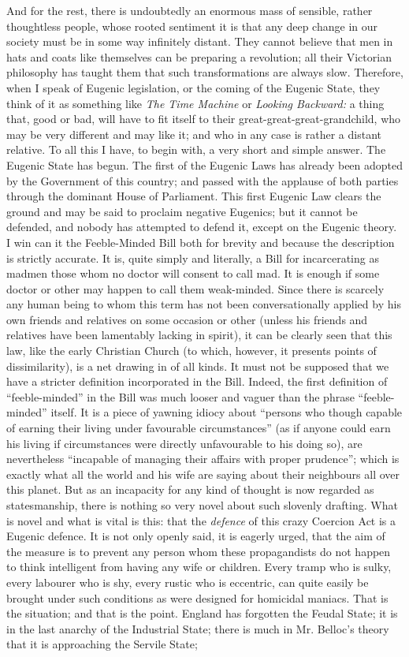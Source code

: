 \documentclass{book}
\begin{document}
And for the rest, there is undoubtedly an enormous mass of sensible, rather thoughtless people, whose rooted sentiment it is that any deep change in our society must be in some way infinitely distant. They cannot believe that men in hats and coats like themselves can be preparing a revolution; all their Victorian philosophy has taught them that such transformations are always slow. Therefore, when I speak of Eugenic legislation, or the coming of the Eugenic State, they think of it as something like \emph{The Time Machine} or \emph{Looking Backward:} a thing that, good or bad, will have to fit itself to their great-great-great-grandchild, who may be very different and may like it; and who in any case is rather a distant relative. To all this I have, to begin with, a very short and simple answer. The Eugenic State has begun. The first of the Eugenic Laws has already been adopted by the Government of this country; and passed with the applause of both parties through the dominant House of Parliament. This first Eugenic Law clears the ground and may be said to proclaim negative Eugenics; but it cannot be defended, and nobody has attempted to defend it, except on the Eugenic theory. I win can it the Feeble-Minded Bill both for brevity and because the description is strictly accurate. It is, quite simply and literally, a Bill for incarcerating as madmen those whom no doctor will consent to call mad. It is enough if some doctor or other may happen to call them weak-minded. Since there is scarcely any human being to whom this term has not been conversationally applied by his own friends and relatives on some occasion or other (unless his friends and relatives have been lamentably lacking in spirit), it can be clearly seen that this law, like the early Christian Church (to which, however, it presents points of dissimilarity), is a net drawing in of all kinds. It must not be supposed that we have a stricter definition incorporated in the Bill. Indeed, the first definition of “feeble-minded” in the Bill was much looser and vaguer than the phrase “feeble-minded” itself. It is a piece of yawning idiocy about “persons who though capable of earning their living under favourable circumstances” (as if anyone could earn his living if circumstances were directly unfavourable to his doing so), are nevertheless “incapable of managing their affairs with proper prudence”; which is exactly what all the world and his wife are saying about their neighbours all over this planet. But as an incapacity for any kind of thought is now regarded as statesmanship, there is nothing so very novel about such slovenly drafting. What is novel and what is vital is this: that the \emph{defence} of this crazy Coercion Act is a Eugenic defence. It is not only openly said, it is eagerly urged, that the aim of the measure is to prevent any person whom these propagandists do not happen to think intelligent from having any wife or children. Every tramp who is sulky, every labourer who is shy, every rustic who is eccentric, can quite easily be brought under such conditions as were designed for homicidal maniacs. That is the situation; and that is the point. England has forgotten the Feudal State; it is in the last anarchy of the Industrial State; there is much in Mr. Belloc’s theory that it is approaching the Servile State; 
\end{document}
